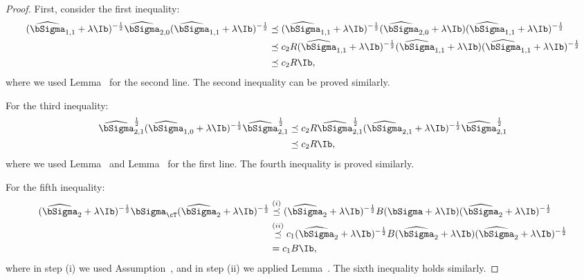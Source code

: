 \documentclass[12pt,a4paper,pdftex,onepage]{article}
\newcommand{\Sighat}{\widehat{{\bSigma}}}
\begin{document}
\begin{proof}
First, consider the first inequality:
\begin{align*}
(\Sighat_{1,1} + \lambda \Ib)^{-\frac{1}{2}} \Sighat_{2,0} (\Sighat_{1,1} + \lambda \Ib)^{-\frac{1}{2}} 
&\preceq (\Sighat_{1,1} + \lambda \Ib)^{-\frac{1}{2}} (\Sighat_{2,0} + \lambda \Ib) (\Sighat_{1,1} + \lambda \Ib)^{-\frac{1}{2}} \\
&\preceq c_2 R (\Sighat_{1,1} + \lambda \Ib)^{-\frac{1}{2}} (\Sighat_{1,1} + \lambda \Ib) (\Sighat_{1,1} + \lambda \Ib)^{-\frac{1}{2}} \\
&\preceq c_2 R \Ib,
\end{align*}
where we used Lemma~ for the second line.
The second inequality can be proved similarly.

For the third inequality:
\begin{align*}
\Sighat_{2,1}^{\frac{1}{2}} (\Sighat_{1,0} + \lambda \Ib)^{-\frac{1}{2}} \Sighat_{2,1}^{\frac{1}{2}} 
&\preceq c_2 R \Sighat_{2,1}^{\frac{1}{2}} (\Sighat_{2,1} + \lambda \Ib)^{-\frac{1}{2}} \Sighat_{2,1}^{\frac{1}{2}} \\
&\preceq c_2 R \Ib,
\end{align*}
where we used Lemma~ and Lemma~ for the first line.
The fourth inequality is proved similarly.

For the fifth inequality:
\begin{align*}
(\widehat{\bSigma}_{2} + \lambda \Ib)^{-\frac{1}{2}} \bSigma_\cT (\widehat{\bSigma}_{2} + \lambda \Ib)^{-\frac{1}{2}}  
&\stackrel{(i)}{\preceq} (\widehat{\bSigma}_{2} + \lambda \Ib)^{-\frac{1}{2}} B (\bSigma + \lambda \Ib) (\widehat{\bSigma}_{2} + \lambda \Ib)^{-\frac{1}{2}} \\
&\stackrel{(ii)}{\preceq} c_1 (\widehat{\bSigma}_{2} + \lambda \Ib)^{-\frac{1}{2}} B (\Sighat_2 + \lambda \Ib) (\widehat{\bSigma}_{2} + \lambda \Ib)^{-\frac{1}{2}} \\
&= c_1 B \Ib,
\end{align*}
where in step (i) we used Assumption~, and in step (ii) we applied Lemma~.
The sixth inequality holds similarly.

\end{proof}
\end{document}
